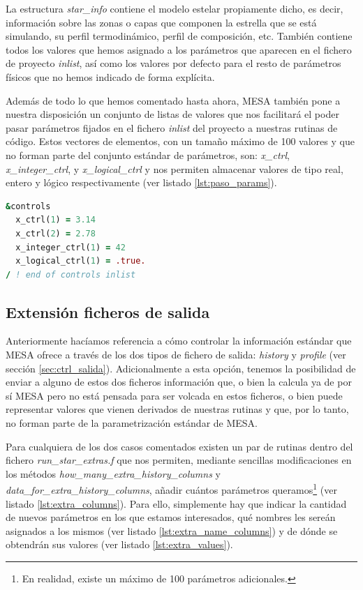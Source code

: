 La estructura \textit{star\_info} contiene el modelo estelar propiamente dicho, es decir, información sobre las zonas o capas que componen la estrella que se está simulando, su perfil termodinámico, perfil de composición, etc. También contiene todos los valores que hemos asignado a los parámetros que aparecen en el fichero de proyecto \textit{inlist}, así como los valores por defecto para el resto de parámetros físicos que no hemos indicado de forma explícita.\par

Además de todo lo que hemos comentado hasta ahora, MESA también pone a nuestra disposición un conjunto de listas de valores que nos facilitará el poder pasar parámetros fijados en el fichero \textit{inlist} del proyecto a nuestras rutinas de código. Estos vectores de elementos, con un tamaño máximo de 100 valores y que no forman parte del conjunto estándar de parámetros, son: \textit{x\_ctrl}, \textit{x\_integer\_ctrl}, y \textit{x\_logical\_ctrl} y nos permiten almacenar valores de tipo real, entero y lógico respectivamente (ver listado \ref{lst:paso_params}).\par

\begin{lstlisting}[language=Fortran, float, caption={Paso de parámetros no estándar a través del fichero de proyecto inlist.}, label={lst:paso_params}]
&controls
  x_ctrl(1) = 3.14
  x_ctrl(2) = 2.78
  x_integer_ctrl(1) = 42
  x_logical_ctrl(1) = .true.
/ ! end of controls inlist
\end{lstlisting}

\subsection{Extensión ficheros de salida}
Anteriormente hacíamos referencia a cómo controlar la información estándar que MESA ofrece a través de los dos tipos de fichero de salida: \textit{history} y \textit{profile} (ver sección \ref{sec:ctrl_salida}). Adicionalmente a esta opción, tenemos la posibilidad de enviar a alguno de estos dos ficheros información que, o bien la calcula ya de por sí MESA pero no está pensada para ser volcada en estos ficheros, o bien puede representar valores que vienen derivados de nuestras rutinas y que, por lo tanto, no forman parte de la parametrización estándar de MESA.\par

Para cualquiera de los dos casos comentados existen un par de rutinas dentro del fichero \textit{run\_star\_extras.f} que nos permiten, mediante sencillas modificaciones en los métodos \textit{how\_many\_extra\_history\_columns} y \textit{data\_for\_extra\_history\_columns}, añadir cuántos parámetros queramos\footnote{En realidad, existe un máximo de 100 parámetros adicionales.} (ver listado \ref{lst:extra_columns}). Para ello, simplemente hay que indicar la cantidad de nuevos parámetros en los que estamos interesados, qué nombres les sereán asignados a los mismos (ver listado \ref{lst:extra_name_columns}) y de dónde se obtendrán sus valores (ver listado \ref{lst:extra_values}).\par

